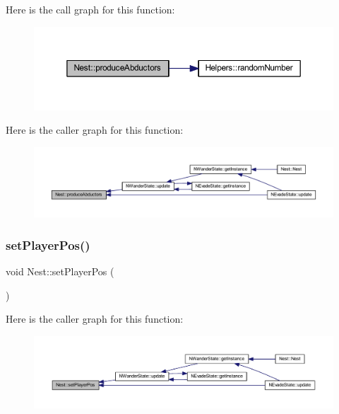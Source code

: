 Here is the call graph for this function\+:
\nopagebreak
\begin{figure}[H]
\begin{center}
\leavevmode
\includegraphics[width=350pt]{class_nest_aa3b2b3ff5ebbf25c942e2622130d8446_cgraph}
\end{center}
\end{figure}
Here is the caller graph for this function\+:
\nopagebreak
\begin{figure}[H]
\begin{center}
\leavevmode
\includegraphics[width=350pt]{class_nest_aa3b2b3ff5ebbf25c942e2622130d8446_icgraph}
\end{center}
\end{figure}
\mbox{\label{class_nest_ac880ed51665003fe201b8efa9f34ab46}} 
\subsubsection{\texorpdfstring{set\+Player\+Pos()}{setPlayerPos()}}
{\footnotesize\ttfamily void Nest\+::set\+Player\+Pos (\begin{DoxyParamCaption}{ }\end{DoxyParamCaption})}

Here is the caller graph for this function\+:
\nopagebreak
\begin{figure}[H]
\begin{center}
\leavevmode
\includegraphics[width=350pt]{class_nest_ac880ed51665003fe201b8efa9f34ab46_icgraph}
\end{center}
\end{figure}
\mbox{\label{class_nest_a8788296c980a2aa1d4f7cac073650496}} 
